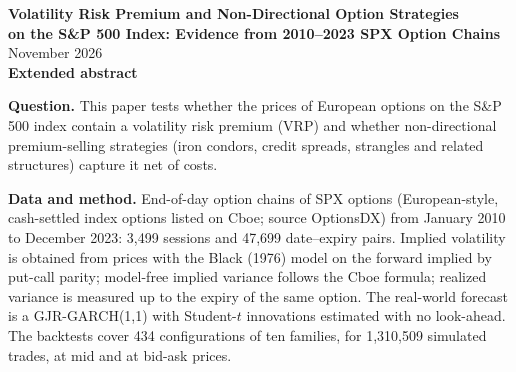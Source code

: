 \documentclass[11pt,a4paper]{article}
\begin{document}
\begin{center}
{\Large\bfseries Volatility Risk Premium and Non-Directional Option Strategies\\[2pt] on the S\&P 500 Index: Evidence from 2010--2023 SPX Option Chains}\\[6pt]
{\small November 2026}\\[4pt]
{\bfseries Extended abstract}
\end{center}
{\let\thefootnote\relax{}}

\textbf{Question.} This paper tests whether the prices of European options on the S\&P 500 index contain a volatility risk premium (VRP) and whether non-directional premium-selling strategies (iron condors, credit spreads, strangles and related structures) capture it net of costs.

\textbf{Data and method.} End-of-day option chains of SPX options (European-style, cash-settled index options listed on Cboe; source OptionsDX) from January 2010 to December 2023: 3,499 sessions and 47,699 date--expiry pairs. Implied volatility is obtained from prices with the Black (1976) model on the forward implied by put-call parity; model-free implied variance follows the Cboe formula; realized variance is measured up to the expiry of the same option. The real-world forecast is a GJR-GARCH(1,1) with Student-$t$ innovations estimated with no look-ahead. The backtests cover 434 configurations of ten families, for 1,310,509 simulated trades, at mid and at bid-ask prices.
\end{document}
